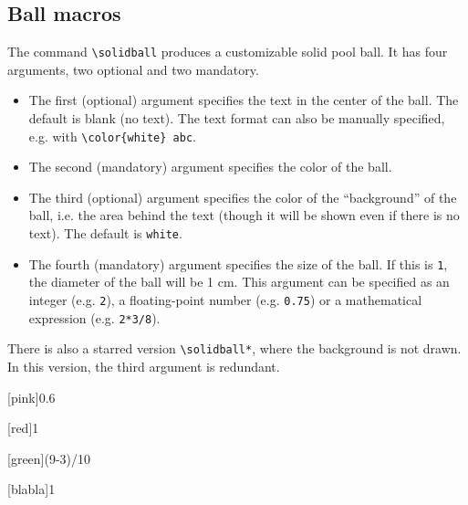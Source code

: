 \documentclass[10pt]{extarticle}
\newcommand{\<}{\langle}
\renewcommand{\>}{\rangle}
\theoremstyle{mystyle}{\newtheorem*{remark}{Remark}}
\theoremstyle{mystyle}{\newtheorem*{remarks}{Remarks}}
\theoremstyle{mystyle}{\newtheorem*{example}{Example}}
\theoremstyle{mystyle}{\newtheorem*{examples}{Examples}}
\theoremstyle{definition}{\newtheorem*{exercise}{Exercise}}
\theoremstyle{warn}
\begin{document}
\subsection{Ball macros}

The command \verb!\solidball! produces a customizable solid pool ball. It has four arguments, two optional and two mandatory.
\begin{itemize}
    \item The first (optional) argument specifies the text in the center of the ball. The default is blank (no text). The text format can also be manually specified, e.g. with \verb!\color{white} abc!.
    \item The second (mandatory) argument specifies the color of the ball.
    \item The third (optional) argument specifies the color of the ``background'' of the ball, i.e. the area behind the text (though it will be shown even if there is no text). The default is \texttt{white}.
    \item The fourth (mandatory) argument specifies the size of the ball. If this is \texttt{1}, the diameter of the ball will be 1 cm. This argument can be specified as an integer (e.g. \texttt{2}), a floating-point number (e.g. \texttt{0.75}) or a mathematical expression (e.g. \texttt{2*3/8}).
\end{itemize}

There is also a starred version \verb!\solidball*!, where the background is not drawn. In this version, the third argument is redundant.

\begin{tcolorbox}[blanker,sidebyside,before skip=10pt,after skip=10pt]
\begin{verbbox}[righthand width=1.3cm]
\end{verbbox}
\begin{verbbox}[righthand width=1.3cm]
\end{verbbox}
\begin{verbbox}[righthand width=1.3cm]
[pink]{0.6}
\end{verbbox}
\begin{verbbox}[righthand width=1.3cm]
[red]{1}
\end{verbbox}
\tcblower %
\begin{verbbox}[righthand width=1.3cm]
\end{verbbox}
\begin{verbbox}[righthand width=1.3cm]
\end{verbbox}
\begin{verbbox}[righthand width=1.3cm]
[green]{(9-3)/10}
\end{verbbox}
\begin{verbbox}[righthand width=1.3cm]
[blabla]{1}
\end{verbbox}
\end{tcolorbox}
\end{document}
